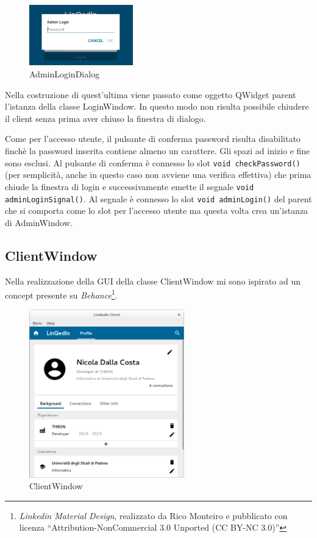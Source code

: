 \documentclass[a4paper]{article}
\begin{document}
\begin{figure}[!ht]
\centering
\includegraphics[width=0.4\textwidth]{AdminLoginDialog.png}
\caption{AdminLoginDialog}
\end{figure}

Nella costruzione di quest'ultima viene passato come oggetto QWidget parent l'istanza della classe LoginWindow. In questo modo non risulta possibile chiudere il client senza prima aver chiuso la finestra di dialogo.

Come per l'accesso utente, il pulsante di conferma password risulta disabilitato finchè la password inserita contiene almeno un carattere. Gli spazi ad inizio e fine sono esclusi. Al pulsante di conferma è connesso lo slot \texttt{void checkPassword()} (per semplicità, anche in questo caso non avviene una verifica effettiva) che prima chiude la finestra di login e successivamente emette il segnale \texttt{void adminLoginSignal()}. Al segnale è connesso lo slot \texttt{void adminLogin()} del parent che si comporta come lo slot per l'accesso utente ma questa volta crea un'istanza di AdminWindow.

\subsection*{ClientWindow}
Nella realizzazione della GUI della classe ClientWindow mi sono ispirato ad un concept presente su \textit{Behance}\footnote{\textit{Linkedin Material Design}, realizzato da Rico Monteiro e pubblicato con licenza ``Attribution-NonCommercial 3.0 Unported (CC BY-NC 3.0)''}.

\begin{figure}[!ht]
\centering
\includegraphics[width=0.6\textwidth]{ClientWindow.png}
\caption{ClientWindow}
\end{figure}
\end{document}
